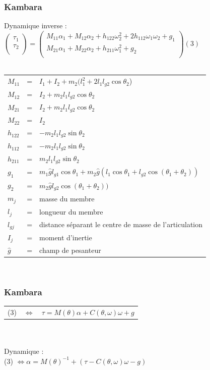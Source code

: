 \documentclass{beamer}
\begin{document}
\begin{frame}
\frametitle{Kambara}
Dynamique inverse : \\
$
\begin{pmatrix}
    \tau_1 \\
    \tau_2 \\
\end{pmatrix}
=
\begin{pmatrix}
    M_{11}\alpha_1 + M_{12}\alpha_2 + h_{122}\omega_2^2 + 2h_{112}\omega_1\omega_2 + g_1 \\
    M_{21}\alpha_1 + M_{22}\alpha_2 + h_{211}\omega_1^2 + g_2 \\
\end{pmatrix}
(3)$\\
~\\
\begin{tabular}{lcl}
    $M_{11}$ & = & $I_1 + I_2 + m_2(l_1^2 + 2 l_1 l_{g2}\cos\theta_2$) \\
    $M_{12}$ & = & $I_2 + m_2l_1l_{g2}\cos\theta_2$ \\
    $M_{21}$ & = & $I_2 + m_2l_1l_{g2}\cos\theta_2$ \\
    $M_{22}$ & = & $I_2$ \\
    $h_{122}$ & = & $-m_2 l_1 l_{g2} \sin\theta_2$ \\
    $h_{112}$ & = & $-m_2 l_1 l_{g2} \sin\theta_2$ \\
    $h_{211}$ & = & $m_2 l_1 l_{g2} \sin\theta_2$ \\
    $g_1$ & = & $m_1 \hat{g} l_{g1} \cos\theta_1 + m_2 \hat{g} (l_1 \cos\theta_1 + l_{g2} \cos(\theta_1 + \theta_2))$ \\
    $g_2$ & = & $m_2 \hat{g} l_{g2} \cos(\theta_1 + \theta_2))$ \\
    $m_j$ & = & masse du membre \\
    $l_j$ & = & longueur du membre \\
    $l_{gj}$ & = & distance séparant le centre de masse de l'articulation \\
    $I_{j}$ & = & moment d'inertie \\
    $\hat{g}$ & = & champ de pesanteur \\
\end{tabular}\\
\end{frame}

\begin{frame}
\frametitle{Kambara}
\begin{tabular}{lcl}
    (3) & $\Leftrightarrow$ & $\tau = M(\theta)\alpha + C(\theta, \omega) \omega + g$ \\
\end{tabular}\\
~\\
Dynamique :\\
(3) $\Leftrightarrow \alpha = M(\theta)^{-1} + (\tau - C(\theta, \omega) \omega - g) $
\end{frame}
\end{document}
